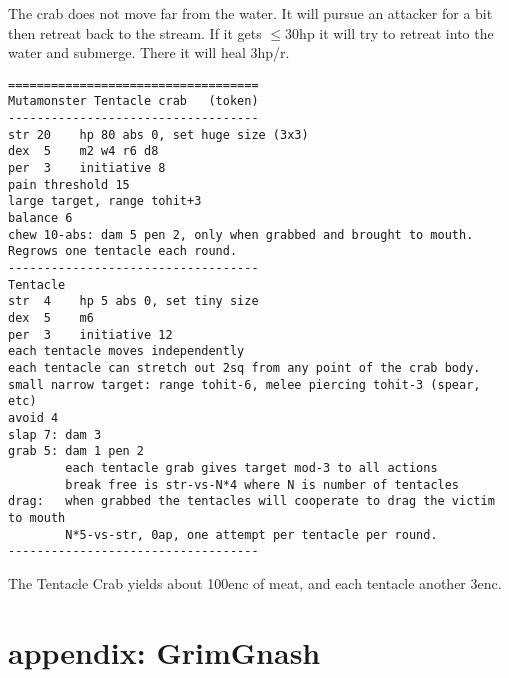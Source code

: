 \begin{description}
The crab does not move far from the water. It will pursue an attacker for a bit then retreat back to the stream. If it gets $\leq$30hp it will try to retreat into the water and submerge. There it will heal 3hp/r.
\goodbreak \begin{samepage} \small \begin{verbatim}
===================================
Mutamonster Tentacle crab   (token)
-----------------------------------
str 20    hp 80 abs 0, set huge size (3x3)
dex  5    m2 w4 r6 d8
per  3    initiative 8
pain threshold 15
large target, range tohit+3
balance 6
chew 10-abs: dam 5 pen 2, only when grabbed and brought to mouth.
Regrows one tentacle each round.
-----------------------------------
Tentacle
str  4    hp 5 abs 0, set tiny size
dex  5    m6
per  3    initiative 12
each tentacle moves independently
each tentacle can stretch out 2sq from any point of the crab body.
small narrow target: range tohit-6, melee piercing tohit-3 (spear, etc)
avoid 4
slap 7: dam 3
grab 5: dam 1 pen 2
        each tentacle grab gives target mod-3 to all actions
        break free is str-vs-N*4 where N is number of tentacles
drag:   when grabbed the tentacles will cooperate to drag the victim to mouth
        N*5-vs-str, 0ap, one attempt per tentacle per round.
-----------------------------------
\end{verbatim} \normalsize \end{samepage}
The Tentacle Crab yields about 100enc of meat, and each tentacle another 3enc.

\end{description}
\flushbottom






























\newpage
\section*{appendix: GrimGnash}

